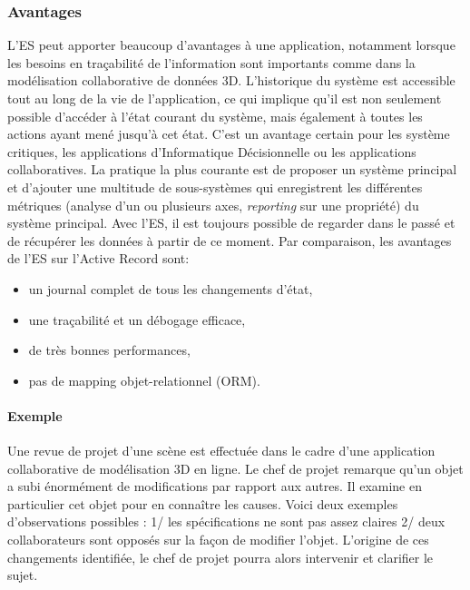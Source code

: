 \subsubsection{Avantages}
L'\gls{ES} peut apporter beaucoup d'avantages à une application, notamment 
lorsque les besoins en traçabilité de l'information sont importants comme dans 
la modélisation collaborative de données \gls{3D}.
L'historique du système est accessible tout au long de la vie de l'application, ce 
qui implique qu'il est non seulement possible d'accéder à l'état courant du 
système, mais également à toutes les actions ayant mené jusqu'à cet état. C'est 
un avantage certain pour les système critiques, les applications d'Informatique 
Décisionnelle ou les applications collaboratives. La pratique la plus 
courante est de proposer un système principal et d'ajouter une multitude de 
sous-systèmes qui enregistrent les différentes métriques (analyse d'un ou 
plusieurs axes, \textit{reporting} sur une propriété) du système principal. Avec 
l'\gls{ES}, il est toujours possible de regarder \og dans le passé\fg{} et de 
récupérer les données à partir de ce moment. Par comparaison, les avantages de 
l'\gls{ES} sur l'Active Record sont:
\begin{itemize}
	\item un journal complet de tous les changements d'état,
	\item une traçabilité et un débogage efficace,
	\item de très bonnes performances,
	\item pas de mapping objet-relationnel (ORM).
\end{itemize}

	
\paragraph{Exemple} 
Une revue de projet d'une scène est effectuée dans le cadre d'une application 
collaborative de modélisation \gls{3D} en ligne. Le chef de projet remarque qu'un 
objet a subi énormément de modifications par rapport aux autres. Il examine en 
particulier cet objet pour en connaître les causes. Voici deux exemples 
d'observations possibles : 1/ les spécifications ne sont pas assez claires 2/ 
deux collaborateurs sont opposés sur la façon de modifier l'objet. L'origine de 
ces changements identifiée, le chef de projet pourra alors intervenir et clarifier 
le sujet. 

